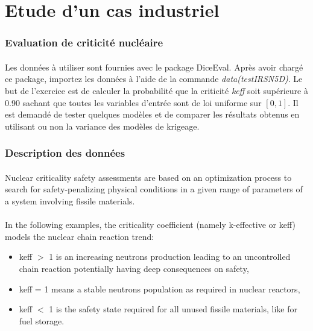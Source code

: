 \documentclass[11pt]{scrartcl}
\begin{document}
\section*{Etude d'un cas industriel}

\subsubsection*{Evaluation de criticité nucléaire}
\paragraph{}
Les données à utiliser sont fournies avec le package DiceEval. Après avoir chargé ce package, importez les données à l'aide de la commande \textit{data(testIRSN5D)}. Le but de l'exercice est de calculer la probabilité que la criticité \textit{keff} soit supérieure à 0.90 sachant que toutes les variables d'entrée sont de loi uniforme sur $[0,1]$. Il est demandé de tester quelques modèles et de comparer les résultats obtenus en utilisant ou non la variance des modèles de krigeage.

\subsubsection*{Description des données}
\paragraph{}
Nuclear criticality safety assessments are based on an optimization process to search for safety-penalizing physical conditions in a given range of parameters of a system involving fissile materials. 
\paragraph{}
In the following examples, the criticality coefficient (namely k-effective or keff) models the nuclear chain reaction trend: 
\begin{itemize}
	\item keff $>$ 1 is an increasing neutrons production leading to an uncontrolled chain reaction potentially having deep consequences on safety,
	\item keff = 1 means a stable neutrons population as required in nuclear reactors, 
  \item keff $<$ 1 is the safety state required for all unused fissile materials, like for fuel storage. 

\end{itemize}
\end{document}
